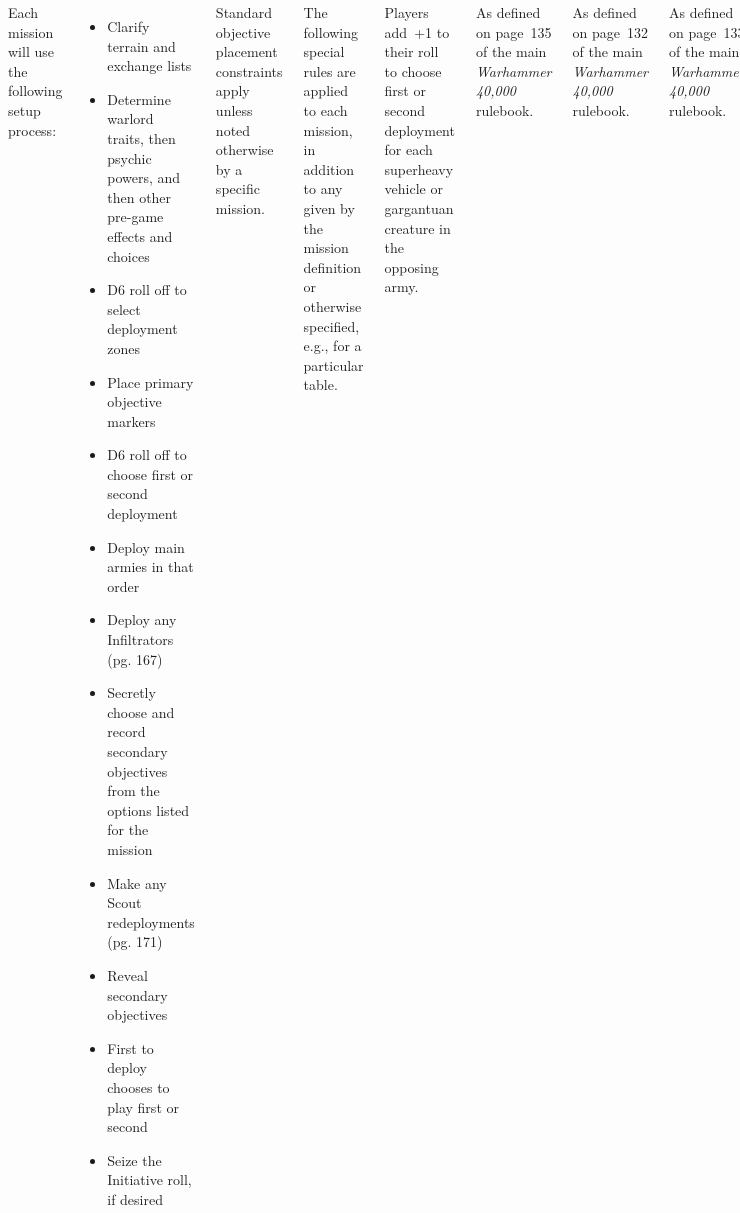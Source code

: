\documentclass{40k}
\begin{document}
\begin{columns}
  
Each mission will use the following setup process:

\begin{itemize}\shortlist
\item Clarify terrain and exchange lists

\item Determine warlord traits, then psychic powers, and then other
  pre-game effects and choices

\item D6 roll off to select deployment zones

\item Place primary objective markers

\item D6 roll off to choose first or second deployment

\item Deploy main armies in that order

\item Deploy any Infiltrators (pg. 167)

\item Secretly choose and record secondary objectives from the options
  listed for the mission

\item Make any Scout redeployments (pg. 171)

\item Reveal secondary objectives

\item First to deploy chooses to play first or second

\item Seize the Initiative roll, if desired

\end{itemize}


Standard objective placement constraints apply unless noted otherwise
by a specific mission.

The following special rules are applied to each mission, in addition
to any given by the mission definition or otherwise specified, e.g.,
for a particular table.

  Players add~+1 to their roll to
choose first or second deployment for each superheavy vehicle or
gargantuan creature in the opposing army.

 As defined on page~135 of the main
\emph{Warhammer 40,000} rulebook.

 As defined on page~132 of
the main \emph{Warhammer 40,000} rulebook.

 As defined on page~133 of
the main \emph{Warhammer 40,000} rulebook.

  Units/models in reserve at game end count
as completely destroyed/removed as a casualty.

\end{columns}
\end{document}

